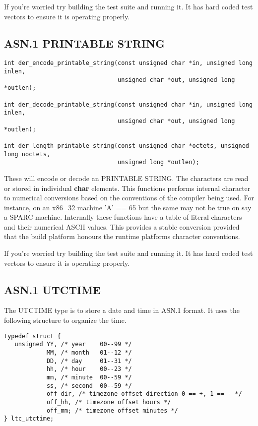 \documentclass[a4paper]{book}
\begin{document}
If you're worried try building the test suite and running it.  It has hard coded test vectors to ensure it is operating properly. 

\subsection{ASN.1 PRINTABLE STRING}

\begin{verbatim}
int der_encode_printable_string(const unsigned char *in, unsigned long inlen,
                                unsigned char *out, unsigned long *outlen);

int der_decode_printable_string(const unsigned char *in, unsigned long inlen,
                                unsigned char *out, unsigned long *outlen);

int der_length_printable_string(const unsigned char *octets, unsigned long noctets, 
                                unsigned long *outlen);
\end{verbatim}

These will encode or decode an PRINTABLE STRING.  The characters are read or stored in individual \textbf{char} elements.  This functions performs internal character
to numerical conversions based on the conventions of the compiler being used.  For instance, on an x86\_32 machine 'A' == 65 but the same may not be true on 
say a SPARC machine.  Internally these functions have a table of literal characters and their numerical ASCII values.  This provides a stable conversion provided
that the build platform honours the runtime platforms character conventions.

If you're worried try building the test suite and running it.  It has hard coded test vectors to ensure it is operating properly. 

\subsection{ASN.1 UTCTIME}

The UTCTIME type is to store a date and time in ASN.1 format.  It uses the following structure to organize the time.

\begin{verbatim}
typedef struct {
   unsigned YY, /* year    00--99 */
            MM, /* month   01--12 */
            DD, /* day     01--31 */
            hh, /* hour    00--23 */
            mm, /* minute  00--59 */
            ss, /* second  00--59 */
            off_dir, /* timezone offset direction 0 == +, 1 == - */
            off_hh, /* timezone offset hours */
            off_mm; /* timezone offset minutes */
} ltc_utctime;
\end{verbatim}
\end{document}
